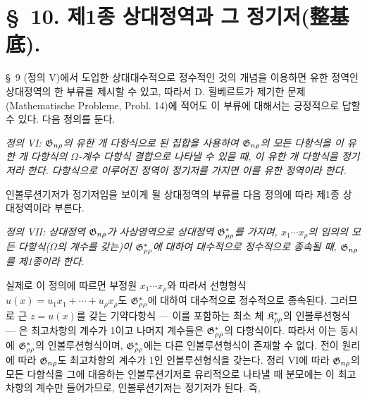 \section*{\S\ 10. 제1종 상대정역과 그 정기저(整基底).}

\S\ 9 (정의 V)에서 도입한 
\glqq{}상대대수적으로 정수적인 것\grqq{}의 개념을 이용하면 유한 정역인 상대정역의 한 부류를 제시할 수 있고, 따라서 D. 힐베르트가 제기한 문제(Mathematische Probleme, Probl. 14)에 적어도 이 부류에 대해서는 긍정적으로 답할 수 있다. 다음 정의를 둔다.

\emph{정의 VI: $\mathfrak G_{n\rho}$의 유한 개 다항식으로 된 집합을 사용하여 $\mathfrak G_{n\rho}$의 모든 다항식을 이 유한 개 다항식의 $\Omega$-계수 다항식 결합으로 나타낼 수 있을 때, 이 유한 개 다항식을 정기저라 한다. 다항식으로 이루어진 정역이 정기저를 가지면 이를 유한 정역이라 한다.}

인볼루션기저가 정기저임을 보이게 될 상대정역의 부류를 다음 정의에 따라 제1종 상대정역이라 부른다.

\emph{정의 VII: 상대정역 $\mathfrak G_{n\rho}$가 사상영역으로 상대정역 $\mathfrak G^*_{\rho\rho}$를 가지며, $x_1\cdots x_\rho$의 임의의 모든 다항식($\Omega$의 계수를 갖는)이 $\mathfrak G^*_{\rho\rho}$에 대하여 대수적으로 정수적으로 종속될 때, $\mathfrak G_{n\rho}$를 제1종이라 한다.}

실제로 이 정의에 따르면 부정원 $x_1\cdots x_\rho$와 따라서 선형형식 $u(x)=u_1x_1+\cdots+u_\rho x_\rho$도 $\mathfrak G^*_{\rho\rho}$에 대하여 대수적으로 정수적으로 종속된다. 그러므로 근 $z=u(x)$를 갖는 기약다항식 --- 이를 포함하는 최소 체 $\mathfrak K^*_{\rho\rho}$의 인볼루션형식 --- 은 최고차항의 계수가 1이고 나머지 계수들은 $\mathfrak G^*_{\rho\rho}$의 다항식이다. 따라서 이는 동시에 $\mathfrak G^*_{\rho\rho}$의 인볼루션형식이며, $\mathfrak G^*_{\rho\rho}$에는 다른 인볼루션형식이 존재할 수 없다. 전이 원리에 따라 $\mathfrak G_{n\rho}$도 최고차항의 계수가 1인 인볼루션형식을 갖는다. 정리 VI에 따라 $\mathfrak G_{n\rho}$의 모든 다항식을 그에 대응하는 인볼루션기저로 유리적으로 나타낼 때 분모에는 이 최고차항의 계수만 들어가므로, 인볼루션기저는 정기저가 된다. 즉,

